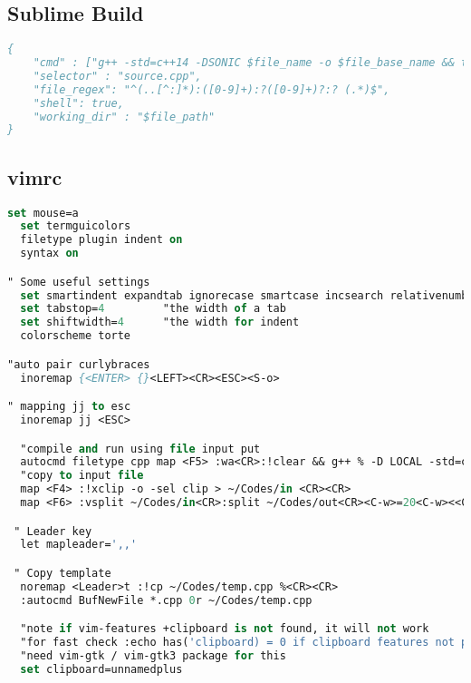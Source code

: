 \subsection*{Sublime Build}
\begin{lstlisting}[language= Pascal, commentstyle=\color{black}, numberstyle=\tiny\color{black}, keywordstyle=\color{black}, stringstyle=\color{black},
]
{
    "cmd" : ["g++ -std=c++14 -DSONIC $file_name -o $file_base_name && timeout 4s ./$file_base_name<inputf.in>outputf.in"], 
    "selector" : "source.cpp",
    "file_regex": "^(..[^:]*):([0-9]+):?([0-9]+)?:? (.*)$",
    "shell": true,
    "working_dir" : "$file_path"
}
\end{lstlisting}
\subsection*{vimrc}

\begin{lstlisting}[language= Pascal, commentstyle=\color{black}, numberstyle=\tiny\color{black}, keywordstyle=\color{black}, stringstyle=\color{black},
]
set mouse=a
  set termguicolors
  filetype plugin indent on
  syntax on

" Some useful settings
  set smartindent expandtab ignorecase smartcase incsearch relativenumber nowrap autoread splitright splitbelow
  set tabstop=4         "the width of a tab
  set shiftwidth=4      "the width for indent
  colorscheme torte

"auto pair curlybraces
  inoremap {<ENTER> {}<LEFT><CR><ESC><S-o>

" mapping jj to esc
  inoremap jj <ESC>  

  "compile and run using file input put  
  autocmd filetype cpp map <F5> :wa<CR>:!clear && g++ % -D LOCAL -std=c++17 -Wall -Wextra -Wconversion -Wshadow -Wfloat-equal -o  ~/Codes/prog && (timeout 5 ~/Codes/prog < ~/Codes/in) >  ~/Codes/out<CR>
  "copy to input file
  map <F4> :!xclip -o -sel clip > ~/Codes/in <CR><CR>
  map <F6> :vsplit ~/Codes/in<CR>:split ~/Codes/out<CR><C-w>=20<C-w><<C-w><C-h>

 " Leader key
  let mapleader=',,'

 " Copy template
  noremap <Leader>t :!cp ~/Codes/temp.cpp %<CR><CR>
  :autocmd BufNewFile *.cpp 0r ~/Codes/temp.cpp

  "note if vim-features +clipboard is not found, it will not work
  "for fast check :echo has('clipboard) = 0 if clipboard features not present,
  "need vim-gtk / vim-gtk3 package for this
  set clipboard=unnamedplus
\end{lstlisting}

